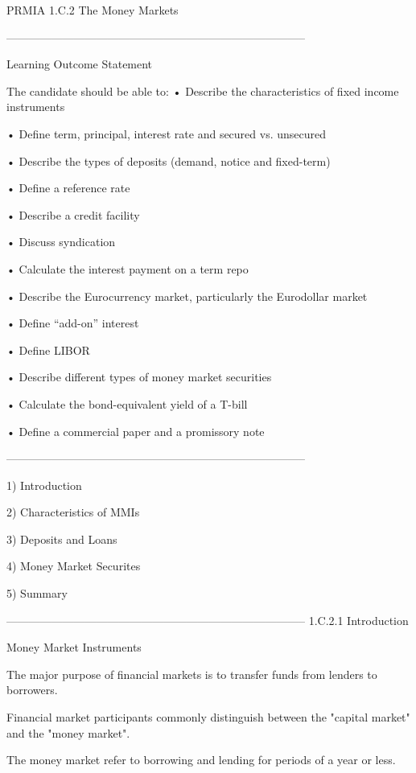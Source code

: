 
PRMIA 1.C.2 The Money Markets

  



--------------------------------------------------------------------------------


Learning Outcome Statement

The candidate should be able to:
•
  Describe the characteristics of fixed income instruments

•
  Define term, principal, interest rate and secured vs. unsecured

•
  Describe the types of deposits (demand, notice and fixed-term)

•
  Define a reference rate

•
  Describe a credit facility

•
  Discuss syndication

•
  Calculate the interest payment on a term repo

•
  Describe the Eurocurrency market, particularly the Eurodollar market

•
  Define “add-on” interest

•
  Define LIBOR

•
  Describe different types of money market securities

•
  Calculate the bond-equivalent yield of a T-bill

•
  Define a commercial paper and a promissory note




--------------------------------------------------------------------------------
 

1) Introduction

2) Characteristics of MMIs

3) Deposits and Loans

4) Money Market Securites

5) Summary


--------------------------------------------------------------------------------
1.C.2.1 Introduction 


Money Market Instruments 

The major purpose of financial markets is to transfer funds from lenders to borrowers. 

Financial market participants commonly distinguish between the "capital market" and the "money market".  

The money market  refer  to borrowing and lending for periods of a year or less.


